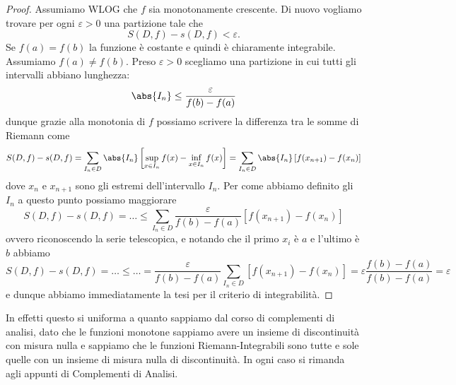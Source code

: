 \documentclass[11pt]{scrartcl}
\begin{document}
	\begin{proof}
		Assumiamo WLOG che $f$ sia monotonamente crescente. 
		Di nuovo vogliamo trovare per ogni $\varepsilon>0$ una partizione tale che
		$$S(D,f)-s(D,f)<\varepsilon.$$
		Se $f(a)=f(b)$ la funzione è costante e quindi è chiaramente integrabile. Assumiamo $f(a)\ne f(b)$. Preso $\varepsilon>0$ scegliamo una partizione in cui tutti gli intervalli abbiano lunghezza:
		$$\abs{I_n}\le \frac{\varepsilon}{f(b)-f(a)}$$
		dunque grazie alla monotonia di $f$ possiamo scrivere la differenza tra le somme di Riemann come
		$$S(D,f)-s(D,f)=\sum_{I_n\in D}\abs{I_n}\left[\sup_{x\in I_n}f(x)-\inf_{x\in I_n} f(x)\right]=\sum_{I_n\in D}\abs{I_n}\left[f(x_{n+1})-f(x_n)\right]$$
		dove $x_n$ e $x_{n+1}$ sono gli estremi dell'intervallo $I_n$. Per come abbiamo definito gli $I_n$ a questo punto possiamo maggiorare
		$$S(D,f)-s(D,f)=\dots\le \sum_{I_n\in D}\frac{\varepsilon}{f(b)-f(a)}\left[f(x_{n+1})-f(x_n)\right]$$
		ovvero riconoscendo la serie telescopica, e notando che il primo $x_i$ è $a$ e l'ultimo è $b$ abbiamo
		$$S(D,f)-s(D,f)=\dots\le\dots=\frac{\varepsilon}{f(b)-f(a)}\sum_{I_n\in D}\left[f(x_{n+1})-f(x_n)\right]=\varepsilon\frac{f(b)-f(a)}{f(b)-f(a)}=\varepsilon$$
		e dunque abbiamo immediatamente la tesi per il criterio di integrabilità.
	\end{proof}
	In effetti questo si uniforma a quanto sappiamo dal corso di complementi di analisi, dato che le funzioni monotone sappiamo avere un insieme di discontinuità con misura nulla e sappiamo che le funzioni Riemann-Integrabili sono tutte e sole quelle con un insieme di misura nulla di discontinuità. In ogni caso si rimanda agli appunti di Complementi di Analisi.
\end{document}
